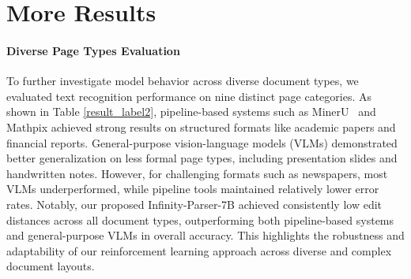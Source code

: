  




\section{More Results}
\paragraph{Diverse Page Types Evaluation}

To further investigate model behavior across diverse document types, we evaluated text recognition performance on nine distinct page categories. As shown in Table \ref{result_label2}, pipeline-based systems such as MinerU~\cite{MinerU} and Mathpix achieved strong results on structured formats like academic papers and financial reports. General-purpose vision-language models (VLMs) demonstrated better generalization on less formal page types, including presentation slides and handwritten notes. However, for challenging formats such as newspapers, most VLMs underperformed, while pipeline tools maintained relatively lower error rates. Notably, our proposed Infinity-Parser-7B achieved consistently low edit distances across all document types, outperforming both pipeline-based systems and general-purpose VLMs in overall accuracy. This highlights the robustness and adaptability of our reinforcement learning approach across diverse and complex document layouts.



